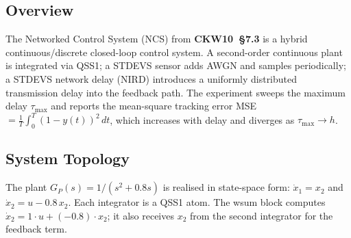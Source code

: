 \subsection*{Overview}

The Networked Control System (NCS) from \textbf{CKW10~§7.3} is a hybrid
continuous/discrete closed-loop control system.
A second-order continuous plant is integrated via QSS1; a STDEVS sensor
adds AWGN and samples periodically; a STDEVS network delay (NIRD) introduces
a uniformly distributed transmission delay into the feedback path.
The experiment sweeps the maximum delay $\tau_{\max}$ and reports the
mean-square tracking error MSE~$= \tfrac{1}{T}\int_0^T (1-y(t))^2\,dt$,
which increases with delay and diverges as $\tau_{\max} \to h$.

\subsection*{System Topology}

\begin{center}
\end{center}

The plant $G_P(s) = 1/(s^2 + 0.8s)$ is realised in state-space form:
$\dot{x}_1 = x_2$ and $\dot{x}_2 = u - 0.8\,x_2$.
Each integrator is a QSS1 atom.
The wsum block computes $\dot{x}_2 = 1\cdot u + (-0.8)\cdot x_2$; it also
receives $x_2$ from the second integrator for the feedback term.

